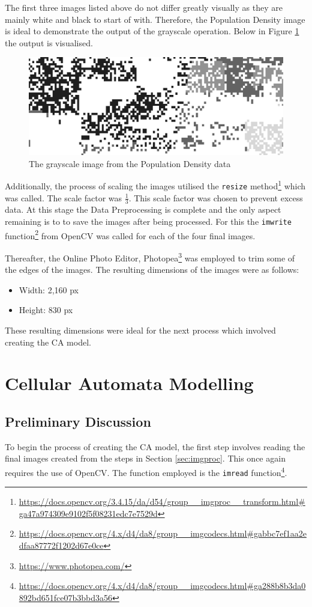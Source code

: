 The first three images listed above do not differ greatly visually as they are mainly white and black to start of with. Therefore, the Population Density image is ideal to demonstrate the output of the grayscale operation. Below in Figure \ref{fig:popogray} the output is visualised.
\begin{figure}[H]
\centering
\includegraphics[width=1\textwidth]{Figures/Chapter3/popgray}
\caption{The grayscale image from the Population Density data}
\label{fig:popogray}
\end{figure}
Additionally, the process of scaling the images utilised the \texttt{resize} method\footnote{\url{https://docs.opencv.org/3.4.15/da/d54/group\_\_imgproc\_\_transform.html\#ga47a974309e9102f5f08231edc7e7529d}} which was called. The scale factor was $\frac{1}{3}$. This scale factor was chosen to prevent excess data. At this stage the Data Preprocessing is complete and the only aspect remaining is to to save the images after being processed. For this the \texttt{imwrite} function\footnote{\url{https://docs.opencv.org/4.x/d4/da8/group__imgcodecs.html\#gabbc7ef1aa2edfaa87772f1202d67e0ce}} from OpenCV was called for each of the four final images.

Thereafter, the Online Photo Editor, Photopea\footnote{\url{https://www.photopea.com/}} was employed to trim some of the edges of the images. The resulting dimensions of the images were as follows:
\begin{itemize}
\item Width: 2,160 px
\item Height: 830 px
\end{itemize}
These resulting dimensions were ideal for the next process which involved creating the CA model.
\section{Cellular Automata Modelling}
\subsection{Preliminary Discussion}
To begin the process of creating the CA model, the first step involves reading the final images created from the steps in Section \ref{sec:imgproc}. This once again requires the use of OpenCV. The function employed is the \texttt{imread} function\footnote{\url{https://docs.opencv.org/4.x/d4/da8/group__imgcodecs.html\#ga288b8b3da0892bd651fce07b3bbd3a56}}.

